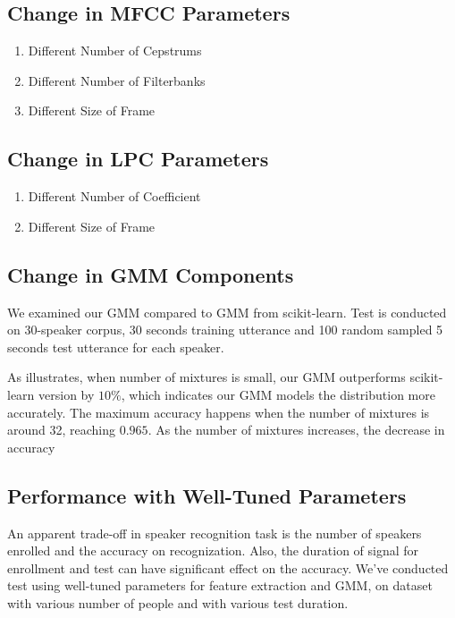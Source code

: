 

\subsection{Change in MFCC Parameters}
\begin{enumerate}
    \item Different Number of Cepstrums

      \item Different Number of Filterbanks

        \item Different Size of Frame
\end{enumerate}

\subsection{Change in LPC Parameters}
\begin{enumerate}
    \item Different Number of Coefficient

        \item Different Size of Frame
\end{enumerate}

\subsection{Change in GMM Components}

We examined our GMM compared to GMM from scikit-learn.
Test is conducted on 30-speaker corpus, 30 seconds training utterance
and 100 random sampled 5 seconds test utterance for each speaker.

As  illustrates, when number of mixtures is small,
our GMM outperforms scikit-learn version by $10\%$, which indicates our
GMM models the distribution more accurately. The maximum accuracy
happens when the number of mixtures is around 32, reaching $0.965$. As
the number of mixtures increases, the decrease in accuracy

\subsection{Performance with Well-Tuned Parameters}

An apparent trade-off in speaker recognition task is the number of speakers
enrolled and the accuracy on recognization.
Also, the duration of signal for enrollment and test can have significant effect on the accuracy.
We've conducted test using well-tuned parameters for feature extraction and GMM, on dataset with
various number of people and with various test duration.

